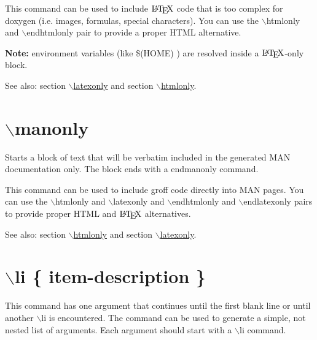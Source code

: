 This command can be used to include $\mbox{\LaTeX}$ code that is too complex for doxygen (i.e. images, formulas, special characters). You can use the $\backslash$htmlonly and $\backslash$endhtmlonly pair to provide a proper HTML alternative.

{\bf Note:} environment variables (like \$(HOME) ) are resolved inside a $\mbox{\LaTeX}$-only block.

\begin{Desc}
\item[See also:]section \hyperlink{commands_cmdlatexonly}{$\backslash$latexonly} and section \hyperlink{commands_cmdhtmlonly}{$\backslash$htmlonly}.\end{Desc}


 \hypertarget{commands_cmdmanonly}{}\section{$\backslash$manonly}\label{commands_cmdmanonly}
 Starts a block of text that will be verbatim included in the generated MAN documentation only. The block ends with a endmanonly command.

This command can be used to include groff code directly into MAN pages. You can use the $\backslash$htmlonly and $\backslash$latexonly and $\backslash$endhtmlonly and $\backslash$endlatexonly pairs to provide proper HTML and $\mbox{\LaTeX}$ alternatives.

\begin{Desc}
\item[See also:]section \hyperlink{commands_cmdhtmlonly}{$\backslash$htmlonly} and section \hyperlink{commands_cmdlatexonly}{$\backslash$latexonly}.\end{Desc}


 \hypertarget{commands_cmdli}{}\section{$\backslash$li \{ item-description \}}\label{commands_cmdli}
 This command has one argument that continues until the first blank line or until another $\backslash$li is encountered. The command can be used to generate a simple, not nested list of arguments. Each argument should start with a $\backslash$li command.

